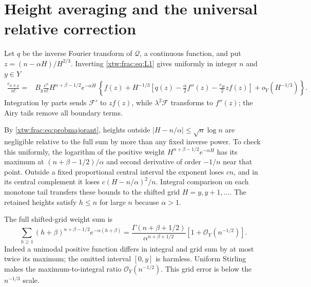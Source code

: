\documentclass[11pt]{article}
\theoremstyle{remark}\newtheorem{remark}[theorem]{Remark}
\newcommand{\OO}{\mathcal O}
\newcommand{\FF}{\mathcal F}
\newcommand{\QQ}{\mathcal Q}
\begin{document}
\section{Height averaging and the universal relative correction}\label{xtw:frac:sec:transfer}\label{xtw:frac:sec:familytransfer}
Let $q$ be the inverse Fourier transform of $\QQ$, a continuous function,
and put $z=(n-\alpha H)/H^{2/3}$. Inverting \eqref{xtw:frac:eq:L1} gives uniformly
in integer $n$ and $y\in Y$
\begin{equation}\label{xtw:frac:eq:coeffwindow}
 \begin{split}
 \frac{c_{n,h;y}}{n!}
  ={}& B_y\frac{e^n}{n!}H^{n+\beta-1/2}e^{-\alpha H}\,
 \left\{ f(z)+H^{-1/3}\left[q(z)-\frac\alpha2f''(z)
                                      -\frac{c_H}{2}zf(z)\right]
                            +o_Y(H^{-1/3})\right\}.
 \end{split}
\end{equation}
Integration by parts sends $\FF'$ to $zf(z)$, while $\lambda^2\FF$
transforms to $f''(z)$; the Airy tails remove all boundary terms.

By \eqref{xtw:frac:eq:probmajorant}, heights outside
$|H-n/\alpha|\le\sqrt n\log n$ are negligible relative to the full sum
by more than any fixed inverse power. To check this uniformly, the logarithm
of the positive weight $H^{n+\beta-1/2}e^{-\alpha H}$ has its maximum at
$(n+\beta-1/2)/\alpha$ and second derivative of order $-1/n$ near that
point. Outside a fixed proportional central interval the exponent loses
$c n$, and in its central complement it loses
$c(H-n/\alpha)^2/n$. Integral comparison on each monotone tail transfers
these bounds to the shifted grid $H=y,y+1,\ldots$.
The retained heights satisfy $h\le n$ for large $n$ because $\alpha>1$.

The full shifted-grid weight sum is
\begin{equation}\label{xtw:frac:eq:gammasum}
 \sum_{h\ge1}(h+\beta)^{n+\beta-1/2}e^{-\alpha(h+\beta)}
 =\frac{\Gamma(n+\beta+1/2)}{\alpha^{n+\beta+1/2}}
                                      [1+\OO_Y(n^{-1/2})].
\end{equation}
Indeed a unimodal positive function differs in integral and grid sum by
at most twice its maximum; the omitted interval $[0,y]$ is harmless.
Uniform Stirling makes the maximum-to-integral ratio $\OO_Y(n^{-1/2})$.
This grid error is below the $n^{-1/3}$ scale.
\end{document}
